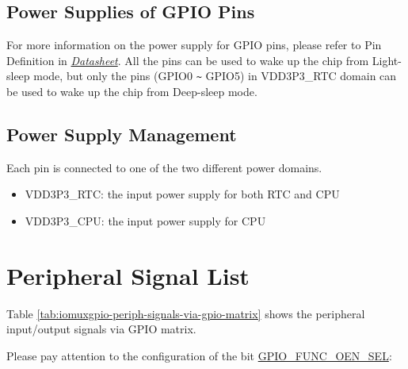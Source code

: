 \documentclass[main\_\_EN.tex]{subfiles}
\begin{document}
\subsection{Power Supplies of GPIO Pins}
For more information on the power supply for GPIO pins, please refer to Pin Definition in  {\it{\href{https://www.espressif.com/sites/default/files/documentation/esp32-c3_datasheet_en.pdf}{\chipname{} Datasheet}}}. All the pins can be used to wake up the chip from Light-sleep mode, but only the pins (GPIO0 \verb+~+ GPIO5) in VDD3P3\_RTC domain can be used to wake up the chip from Deep-sleep mode.

\subsection{Power Supply Management}

Each \chipname{} pin is connected to one of the two different power domains.

\begin{itemize}
    \item VDD3P3\_RTC: the input power supply for both RTC and CPU
    \item VDD3P3\_CPU: the input power supply for CPU
\end{itemize}

\section{Peripheral Signal List}
\label{sec:peripheral_signals}

Table \ref{tab:iomuxgpio-periph-signals-via-gpio-matrix} shows the peripheral input/output signals via GPIO matrix.

Please pay attention to the configuration of the bit \hyperref[fielddesc:GPIOFUNCNOENSEL]{GPIO\_FUNC\_OEN\_SEL}:
\end{document}
